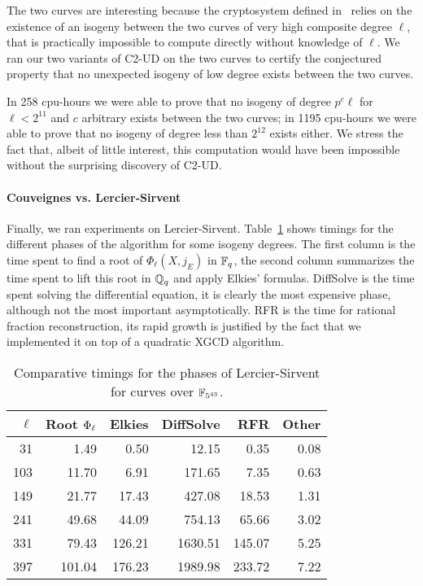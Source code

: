 The two curves are interesting because the cryptosystem defined
in~\cite{teske06} relies on the existence of an isogeny between the
two curves of very high composite degree $\ell$, that is practically
impossible to compute directly without knowledge of $\ell$. We ran our
two variants of C2-UD on the two curves to certify the conjectured
property that no unexpected isogeny of low degree exists between the
two curves.

In 258 cpu-hours we were able to prove that no isogeny of degree
$p^c\ell$ for $\ell<2^{11}$ and $c$ arbitrary exists between the two
curves; in 1195 cpu-hours we were able to prove that no isogeny of
degree less than $2^{12}$ exists either. We stress the fact that,
albeit of little interest, this computation would have been impossible
without the surprising discovery of C2-UD.


\paragraph{Couveignes vs. Lercier-Sirvent}
Finally, we ran experiments on Lercier-Sirvent. Table~\ref{tab:ls}
shows timings for the different phases of the algorithm for some
isogeny degrees. The first column is the time spent to find a root of
$\Phi_\ell(X,j_E)$ in $\mathbb{F}_q$, the second column summarizes the time
spent to lift this root in $\mathbb{Q}_q$ and apply Elkies'
formulas. DiffSolve is the time spent solving the differential
equation, it is clearly the most expensive phase, although not the
most important asymptotically. RFR is the time for rational fraction
reconstruction, its rapid growth is justified by the fact that we
implemented it on top of a quadratic XGCD algorithm.

\begin{table}[ht]
  \centering
  \begin{tabular}{r r r r r r}
    \hline
    $\ell$ & Root $\Phi_\ell$ & Elkies & DiffSolve & RFR & Other\\
    \hline
    31&1.49&0.50&12.15&0.35&0.08\\
    103&11.70&6.91&171.65&7.35&0.63\\
    149&21.77&17.43&427.08&18.53&1.31\\
    241&49.68&44.09&754.13&65.66&3.02\\
    331&79.43&126.21&1630.51&145.07&5.25\\
    397&101.04&176.23&1989.98&233.72&7.22\\
    \hline
  \end{tabular}
  \caption{Comparative timings for the phases of Lercier-Sirvent for curves over $\mathbb{F}_{5^{43}}$.}
  \label{tab:ls}
\end{table}

